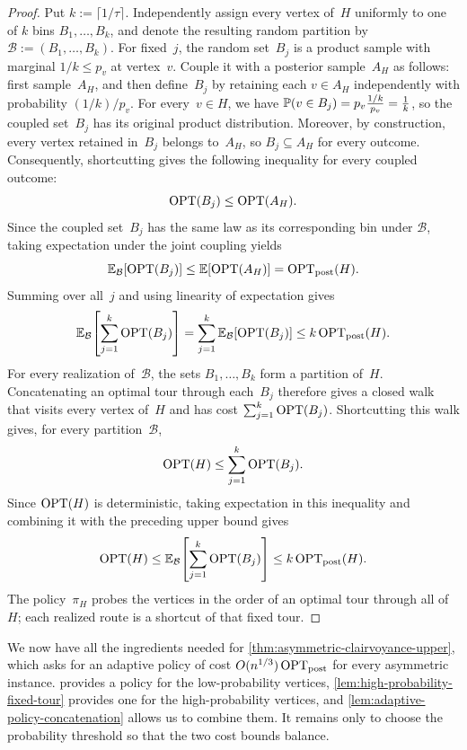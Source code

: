 \documentclass[12pt,a4paper,oneside]{report}
\begin{document}
\begin{proof}
Put $k:=\lceil1/\tau\rceil$.  Independently assign every vertex of~$H$
uniformly to one of $k$ bins $B_1,\ldots,B_k$, and denote the resulting random
partition by~$\mathcal B:=(B_1,\ldots,B_k)$.
For fixed~$j$, the random set~$B_j$ is a product sample with marginal
$1/k\le p_v$ at vertex~$v$.  Couple it with a posterior sample~$A_H$ as
follows: first sample~$A_H$, and then define~$B_j$ by retaining each
$v\in A_H$ independently with probability $(1/k)/p_v$.  For every~$v\in H$,
we have $\P(v\in B_j)=p_v\frac{1/k}{p_v}=\frac1k$, so
the coupled set~$B_j$ has its original product distribution.  Moreover, by
construction, every vertex retained in~$B_j$ belongs to~$A_H$, so
$B_j\subseteq A_H$ for every outcome.  Consequently, shortcutting gives the
following inequality for every coupled outcome:
\[
    \opt(B_j)\le\opt(A_H).
\]
Since the coupled set~$B_j$ has the same law as its corresponding bin under
$\mathcal B$, taking expectation under the joint coupling yields
\[
    \E_{\mathcal B}[\opt(B_j)]
    \le \E[\opt(A_H)]
    =\optpost(H).
\]
Summing over all~$j$ and using linearity of expectation gives
\[
    \E_{\mathcal B}\!\left[\sum_{j=1}^k\opt(B_j)\right]
    =\sum_{j=1}^k\E_{\mathcal B}[\opt(B_j)]
    \le k\optpost(H).
\]
For every realization of~$\mathcal B$, the sets $B_1,\ldots,B_k$ form a
partition of~$H$.  Concatenating an optimal tour through each~$B_j$ therefore
gives a closed walk that visits every vertex of~$H$ and has cost
$\sum_{j=1}^k\opt(B_j)$.  Shortcutting this walk gives, for every
partition~$\mathcal B$,
\[
    \opt(H)\le\sum_{j=1}^k\opt(B_j).
\]
Since $\opt(H)$ is deterministic, taking expectation in this inequality and
combining it with the preceding upper bound gives
\[
    \opt(H)
    \le
    \E_{\mathcal B}\!\left[\sum_{j=1}^k\opt(B_j)\right]
    \le k\optpost(H).
\]
The policy~$\pi_H$ probes the vertices in the order of an optimal tour through
all of~$H$; each realized route is a shortcut of that fixed tour.
\end{proof}

We now have all the ingredients needed for \cref{thm:asymmetric-clairvoyance-upper},
which asks for an adaptive policy of cost
$O(n^{1/3})\optpost$ for every asymmetric \StochTSP{} instance.
 provides a policy for the low-probability
vertices, \cref{lem:high-probability-fixed-tour} provides one for the
high-probability vertices, and \cref{lem:adaptive-policy-concatenation} allows
us to combine them.  It remains only to choose the probability threshold so
that the two cost bounds balance.
\end{document}
